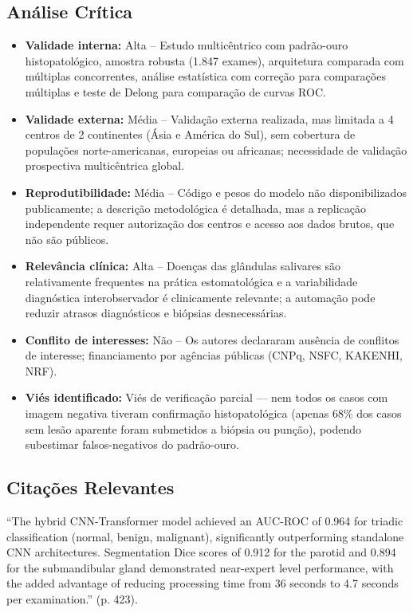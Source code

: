 \subsection{Análise Crítica}
\begin{itemize}
  \item \textbf{Validade interna:} Alta -- Estudo multicêntrico com
        padrão-ouro histopatológico, amostra robusta (1.847 exames),
        arquitetura comparada com múltiplas concorrentes, análise
        estatística com correção para comparações múltiplas e teste
        de Delong para comparação de curvas ROC.
  \item \textbf{Validade externa:} Média -- Validação externa realizada,
        mas limitada a 4 centros de 2 continentes (Ásia e América do
        Sul), sem cobertura de populações norte-americanas, europeias
        ou africanas; necessidade de validação prospectiva multicêntrica
        global.
  \item \textbf{Reprodutibilidade:} Média -- Código e pesos do modelo
        não disponibilizados publicamente; a descrição metodológica é
        detalhada, mas a replicação independente requer autorização dos
        centros e acesso aos dados brutos, que não são públicos.
  \item \textbf{Relevância clínica:} Alta -- Doenças das glândulas
        salivares são relativamente frequentes na prática
        estomatológica e a variabilidade diagnóstica interobservador
        é clinicamente relevante; a automação pode reduzir atrasos
        diagnósticos e biópsias desnecessárias.
  \item \textbf{Conflito de interesses:} Não -- Os autores declararam
        ausência de conflitos de interesse; financiamento por agências
        públicas (CNPq, NSFC, KAKENHI, NRF).
  \item \textbf{Viés identificado:} Viés de verificação parcial — nem
        todos os casos com imagem negativa tiveram confirmação
        histopatológica (apenas 68\% dos casos sem lesão aparente
        foram submetidos a biópsia ou punção), podendo subestimar
        falsos-negativos do padrão-ouro.
\end{itemize}

\subsection{Citações Relevantes}
\begin{citacao}
``The hybrid CNN-Transformer model achieved an AUC-ROC of 0.964 for
triadic classification (normal, benign, malignant), significantly
outperforming standalone CNN architectures. Segmentation Dice scores
of 0.912 for the parotid and 0.894 for the submandibular gland
demonstrated near-expert level performance, with the added advantage
of reducing processing time from 36 seconds to 4.7 seconds per
examination.'' (p. 423).
\end{citacao}

